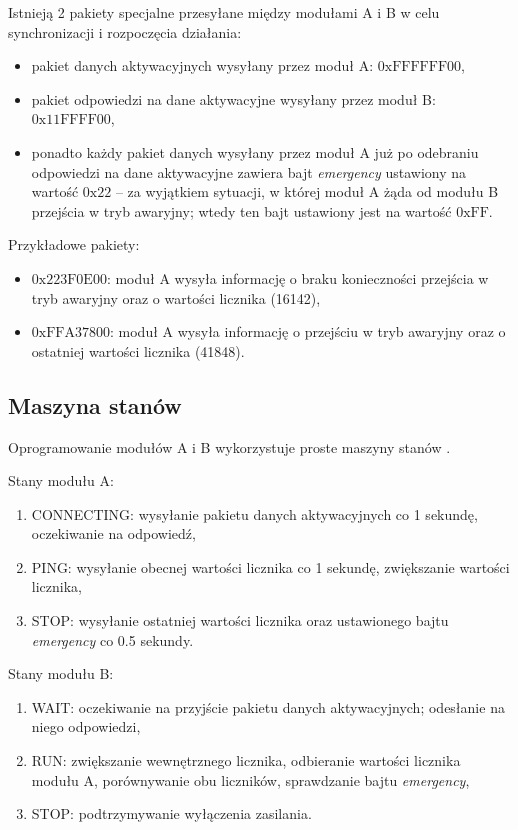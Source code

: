 Istnieją 2 pakiety specjalne przesyłane między modułami A i B w celu synchronizacji i rozpoczęcia działania:

\begin{itemize}
\item pakiet danych aktywacyjnych wysyłany przez moduł A: $0\mathrm{xFFFFFF}00$,
\item pakiet odpowiedzi na dane aktywacyjne wysyłany przez moduł B: $0\mathrm{x11FFFF}00$,
\item ponadto każdy pakiet danych wysyłany przez moduł A już po odebraniu odpowiedzi na dane aktywacyjne zawiera bajt \textit{emergency} ustawiony na wartość $0\mathrm{x}22$ -- za wyjątkiem sytuacji, w której moduł A żąda od modułu B przejścia w tryb awaryjny; wtedy ten bajt ustawiony jest na wartość $0\mathrm{xFF}$.
\end{itemize}

Przykładowe pakiety:

\begin{itemize}
\item $0\mathrm{x}223\mathrm{F}0\mathrm{E}00$: moduł A wysyła informację o braku konieczności przejścia w tryb awaryjny oraz o wartości licznika (16142),
\item $0\mathrm{xFFA}37800$: moduł A wysyła informację o przejściu w tryb awaryjny oraz o ostatniej wartości licznika (41848).
\end{itemize}

\subsection{Maszyna stanów}
\label{subsec:maszyna_stanow}

Oprogramowanie modułów A i B wykorzystuje proste maszyny stanów \cite{Bro69}.

Stany modułu A:

\begin{enumerate}
\item CONNECTING: wysyłanie pakietu danych aktywacyjnych co 1 sekundę, oczekiwanie na odpowiedź,
\item PING: wysyłanie obecnej wartości licznika co 1 sekundę, zwiększanie wartości licznika,
\item STOP: wysyłanie ostatniej wartości licznika oraz ustawionego bajtu \textit{emergency} co \num{0.5} sekundy.
\end{enumerate}

Stany modułu B:

\begin{enumerate}
\item WAIT: oczekiwanie na przyjście pakietu danych aktywacyjnych; odesłanie na niego odpowiedzi,
\item RUN: zwiększanie wewnętrznego licznika, odbieranie wartości licznika modułu A, porównywanie obu liczników, sprawdzanie bajtu \textit{emergency},
\item STOP: podtrzymywanie wyłączenia zasilania.
\end{enumerate}

